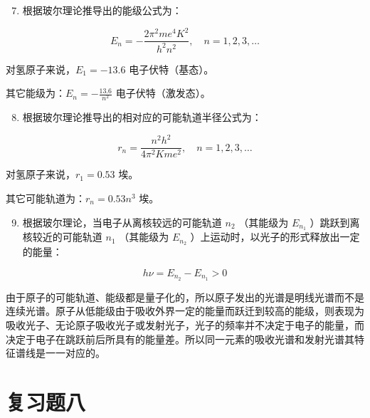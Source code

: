 \begin{enumerate}
\setcounter{enumi}{6}
\item
  根据玻尔理论推导出的能级公式为：
\end{enumerate}

\[
E _ {n} = - \frac {2 \pi^ {2} m e ^ {4} K ^ {2}}{h ^ {2} n ^ {2}}, \quad n = 1, 2, 3, \dots
\]

对氢原子来说，\(E_{1}=-13.6\) 电子伏特（基态）。

其它能级为：\(E_{n}=-\frac{13.6}{n^{2}}\) 电子伏特（激发态）。

\begin{enumerate}
\setcounter{enumi}{7}
\item
  根据玻尔理论推导出的相对应的可能轨道半径公式为：
\end{enumerate}

\[
r _ {n} = \frac {n ^ {2} h ^ {2}}{4 \pi^ {2} K m e ^ {2}}, \quad n = 1, 2, 3, \dots
\]

对氢原子来说，\(r_{1}=0.53\) 埃。

其它可能轨道为：\(r_{n}=0.53n^{3}\) 埃。

\begin{enumerate}
\setcounter{enumi}{8}
\item
  根据玻尔理论，当电子从离核较远的可能轨道 \(n_{2}\) （其能级为
  \(E_{n_{1}}\) ）跳跃到离核较近的可能轨道 \(n_{1}\) （其能级为
  \(E_{n_{2}}\) ）上运动时，以光子的形式释放出一定的能量：
\end{enumerate}

\[
h \nu = E _ {n _ {2}} - E _ {n _ {1}} > 0
\]

由于原子的可能轨道、能级都是量子化的，所以原子发出的光谱是明线光谱而不是连续光谱。原子从低能级由于吸收外界一定的能量而跃迁到较高的能级，则表现为吸收光子、无论原子吸收光子或发射光子，光子的频率并不决定于电子的能量，而决定于电子在跳跃前后所具有的能量差。所以同一元素的吸收光谱和发射光谱其特征谱线是一一对应的。

\section{复习题八}

